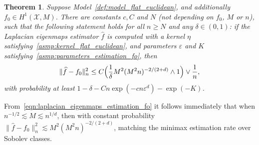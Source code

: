 \documentclass[aos]{imsart}
\theoremstyle{plain}
\newtheorem{theorem}{Theorem}
\theoremstyle{definition}
\theoremstyle{remark}
\newcommand{\wh}[1]{\widehat{#1}}
\newcommand{\mc}[1]{\mathcal{#1}}
\newcommand{\1}{\mathbf{1}}
\begin{document}
\begin{theorem}
	\label{thm:laplacian_eigenmaps_estimation_fo}
	Suppose Model~\ref{def:model_flat_euclidean}, and additionally $f_0 \in H^1(\mc{X},M)$. There are constants $c,C$ and $N$ (not depending on $f_0$, $M$ or $n$), such that the following statement holds for all $n \geq N$ and any $\delta \in (0,1)$: if the Laplacian eigenmaps estimator $\wh{f}$ is computed with a kernel $\eta$ satisfying~\ref{asmp:kernel_flat_euclidean}, and parameters $\varepsilon$ and $K$ satisfying~\ref{asmp:parameters_estimation_fo}, then
	\begin{equation}
	\label{eqn:laplacian_eigenmaps_estimation_fo}
	\|\wh{f} - f_0\|_n^2 \leq C\Bigl(\frac{1}{\delta}M^2(M^2n)^{-2/(2 + d)} \wedge 1\Bigr) \vee \frac{1}{n},
	\end{equation}
	with probability at least $1 - \delta - Cn\exp(-cn\varepsilon^d) - \exp(-K)$.
\end{theorem}
From~\eqref{eqn:laplacian_eigenmaps_estimation_fo} it follows immediately that when $n^{-1/2} \lesssim M \lesssim n^{1/d}$, then with constant probability $\|\wh{f} - f_0\|_n^2 \lesssim M^2(M^2n)^{-2/(2 + d)}$, matching the minimax estimation rate over Sobolev classes.
\end{document}
